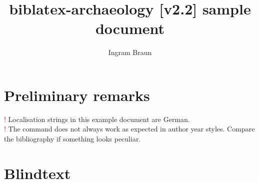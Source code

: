 \documentclass[a4paper,12pt]{scrartcl}
\title{biblatex-archaeology [v2.2] sample document}
\subtitle{\explhead}
\author{Ingram Braun}
\newcommand{\exmplwarn}[1]{\textcolor{red}{\Huge!} #1\\}
\begin{document}
\maketitle
\tableofcontents

\section{Preliminary remarks}

\exmplwarn{Localisation strings in this example document are German.}
    {\exmplwarn{The \detokenize{\fullcite} command does not always work as expected in author year styles. Compare the bibliography if something looks peculiar.}%
    }
    {}

\section{Blindtext}
\end{document}

